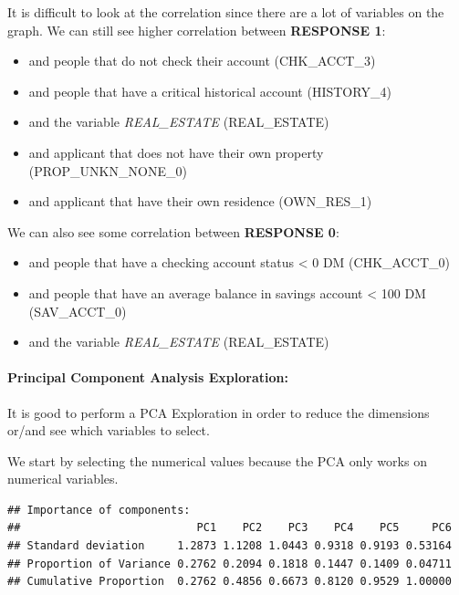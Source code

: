 \documentclass[
]{article}
\providecommand{\tightlist}{%
  \setlength{\itemsep}{0pt}\setlength{\parskip}{0pt}}
\begin{document}
It is difficult to look at the correlation since there are a lot of
variables on the graph. We can still see higher correlation between
\textbf{RESPONSE 1}:

\begin{itemize}
\tightlist
\item
  and people that do not check their account (CHK\_ACCT\_3)
\item
  and people that have a critical historical account (HISTORY\_4)
\item
  and the variable \emph{REAL\_ESTATE} (REAL\_ESTATE)
\item
  and applicant that does not have their own property
  (PROP\_UNKN\_NONE\_0)
\item
  and applicant that have their own residence (OWN\_RES\_1)
\end{itemize}

We can also see some correlation between \textbf{RESPONSE 0}:

\begin{itemize}
\tightlist
\item
  and people that have a checking account status \textless{} 0 DM
  (CHK\_ACCT\_0)
\item
  and people that have an average balance in savings account \textless{}
  100 DM (SAV\_ACCT\_0)
\item
  and the variable \emph{REAL\_ESTATE} (REAL\_ESTATE)
\end{itemize}

\hypertarget{principal-component-analysis-exploration}{%
\paragraph{Principal Component Analysis
Exploration:}\label{principal-component-analysis-exploration}}

It is good to perform a PCA Exploration in order to reduce the
dimensions or/and see which variables to select.

We start by selecting the numerical values because the PCA only works on
numerical variables.

\begin{verbatim}
## Importance of components:
##                           PC1    PC2    PC3    PC4    PC5     PC6
## Standard deviation     1.2873 1.1208 1.0443 0.9318 0.9193 0.53164
## Proportion of Variance 0.2762 0.2094 0.1818 0.1447 0.1409 0.04711
## Cumulative Proportion  0.2762 0.4856 0.6673 0.8120 0.9529 1.00000
\end{verbatim}
\end{document}
